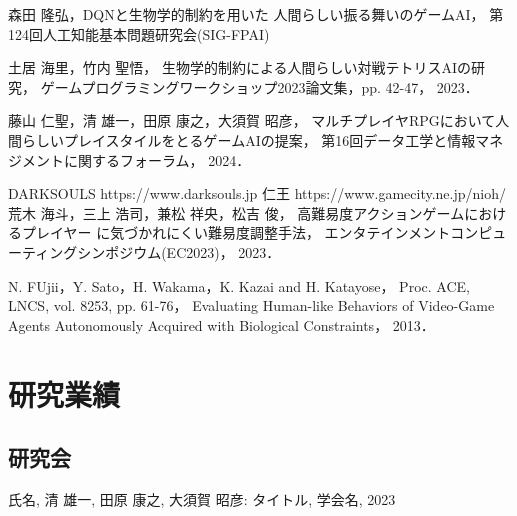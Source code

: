 \documentclass[a4paper,12pt,oneside,openany,titlepage]{jreport}
\renewcommand{\bibname}{参考文献}
\begin{document}
\addcontentsline{toc}{chapter}{\bibname}
\begin{thebibliography}{99}
   森田 隆弘，DQNと生物学的制約を用いた
人間らしい振る舞いのゲームAI，
第124回人工知能基本問題研究会(SIG-FPAI)

  土居 海里，竹内 聖悟，
生物学的制約による人間らしい対戦テトリスAIの研究，
ゲームプログラミングワークショップ2023論文集，pp. 42-47，
2023．

 藤山 仁聖，清 雄一，田原 康之，大須賀 昭彦，
マルチプレイヤRPGにおいて人間らしいプレイスタイルをとるゲームAIの提案，
第16回データ工学と情報マネジメントに関するフォーラム，
2024．

 DARKSOULS https://www.darksouls.jp
 仁王 https://www.gamecity.ne.jp/nioh/
 荒木 海斗，三上 浩司，兼松 祥央，松吉 俊，
高難易度アクションゲームにおけるプレイヤー
に気づかれにくい難易度調整手法，
エンタテインメントコンピューティングシンポジウム(EC2023)，
2023．


 N. FUjii，Y. Sato，H. Wakama，K. Kazai and H. Katayose，
Proc. ACE, LNCS, vol. 8253, pp. 61-76，
Evaluating Human-like Behaviors of Video-Game Agents Autonomously Acquired with Biological Constraints，
2013．


\end{thebibliography}

\newpage

\chapter*{研究業績}
\thispagestyle{plain}
\lhead{\leftmark}
\rhead{\thepage}
\renewcommand{\headrulewidth}{1pt}
 \section*{研究会}
 氏名, 清 雄一, 田原 康之, 大須賀 昭彦: タイトル,  学会名, 2023
\end{document}
